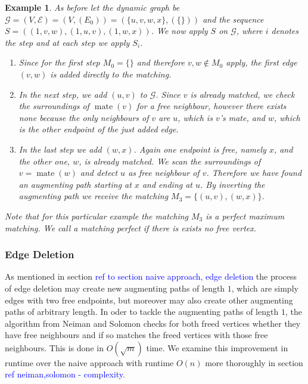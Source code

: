 \documentclass{article}      %
\newcommand\todo[1]{\textcolor{blue}{#1}}
\newtheorem{example}{Example}[subsection]
\DeclareMathOperator\mate{mate}
\begin{document}
\begin{example}
\label{ex:ns-aug-path}
As before let the dynamic graph be $\mathcal{G}=(V,\mathcal{E})=(V,(E_0))=(\{u,v,w,x\},(\{\}))$ and the sequence $S=((1,v,w),(1,u,v),(1,w,x))$. We now apply $S$ on $\mathcal{G}$, where $i$ denotes the step and at each step we apply $S_i$.
\begin{enumerate}
	\item[i=0:] Since for the first step $M_0 = \{\}$ and therefore $v,w \notin M_0$ apply, the first edge $(v,w)$ is added directly to the matching. 	\item[i=1:] In the next step, we add $(u,v)$ to $\mathcal{G}$. Since $v$ is already matched, we check the surroundings of $\mate(v)$ for a free neighbour, however there exists none because the only neighbours of $v$ are $u$, which is $v$'s mate, and $w$, which is the other endpoint of the just added edge. 
	\item[i=2:] In the last step we add $(w,x)$. Again one endpoint is free, namely $x$, and the other one, $w$, is already matched. We scan the surroundings of $v=\mate(w)$ and detect $u$ as free neighbour of $v$. Therefore we have found an augmenting path starting at $x$ and ending at $u$. By inverting the augmenting path we receive the matching $M_3=\{(u,v),(w,x)\}$.
\end{enumerate}
Note that for this particular example the matching $M_3$ is a \emph{perfect} maximum matching. We call a matching \emph{perfect} if there is exists no free vertex.
\end{example}

\subsubsection{Edge Deletion}
\label{sec:ns-edge-out}

As mentioned in section \todo{ref to section naive approach, edge deletion} the process of edge deletion may create new augmenting paths of length $1$, which are simply edges with two free endpoints, but moreover may also create other augmenting paths of arbitrary length. In oder to tackle the augmenting paths of length $1$, the algorithm from Neiman and Solomon checks for both freed vertices whether they have free neighbours and if so matches the freed vertices with those free neighbours. This is done in $O(\sqrt{m})$ time. We examine this improvement in runtime over the naive approach with runtime $O(n)$ more thoroughly in section \todo{ref neiman,solomon - complexity}. 
\end{document}
